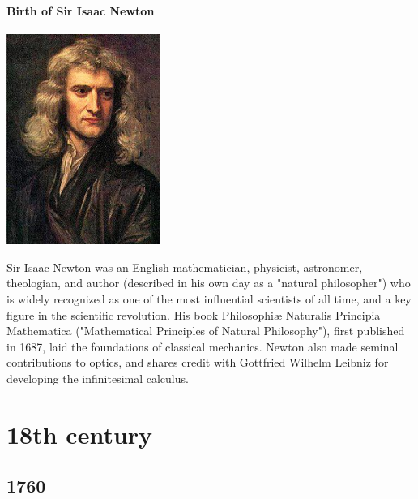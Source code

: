 \documentclass[11pt]{report}
\begin{document}
\subsection{Birth of Sir Isaac Newton}
\vspace{2mm}\begin{center}\includegraphics[width=5cm]{./img/isaacNewton.jpg}\end{center}
Sir Isaac Newton was an English mathematician, physicist, astronomer, theologian, and author (described in his own day as a "natural philosopher") who is widely recognized as one of the most influential scientists of all time, and a key figure in the scientific revolution. His book Philosophiæ Naturalis Principia Mathematica ("Mathematical Principles of Natural Philosophy"), first published in 1687, laid the foundations of classical mechanics. Newton also made seminal contributions to optics, and shares credit with Gottfried Wilhelm Leibniz for developing the infinitesimal calculus.


										
\part{18th century}
\chapter{1760}
\section{}
\end{document}
